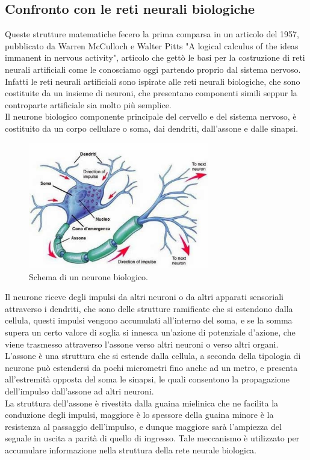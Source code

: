 \subsection{Confronto con le reti neurali biologiche}

Queste strutture matematiche fecero la prima comparsa in un articolo del 1957, pubblicato da Warren McCulloch e Walter Pitts
"A logical calculus of the ideas immanent in nervous activity", articolo che gettò le basi per la costruzione di reti neurali artificiali
come le conosciamo oggi partendo proprio dal sistema nervoso.
Infatti le reti neurali artificiali sono ispirate alle reti neurali biologiche, che sono costituite da un insieme di neuroni,
che presentano componenti simili seppur la controparte artificiale sia molto più semplice.\\
Il neurone biologico componente principale del cervello e del sistema nervoso, è costituito da un corpo cellulare o soma, dai dendriti, 
dall'assone e dalle sinapsi.\\

    \begin{figure}[H]
        \centering
        \includegraphics[width=0.7\textwidth]{imgs/neurone.jpg}
        \caption{Schema di un neurone biologico.}
        \label{fig:neuron_bio}
    \end{figure}

Il neurone riceve degli impulsi da altri neuroni o da altri apparati sensoriali attraverso i dendriti, che sono delle strutture ramificate
che si estendono dalla cellula, questi impulsi vengono accumulati all'interno del soma, e se la somma supera un certo valore di soglia
si innesca un'azione di potenziale d'azione, che viene trasmesso attraverso l'assone verso altri neuroni o verso altri organi.
L'assone è una struttura che si estende dalla cellula, a seconda della tipologia di neurone può estendersi da pochi micrometri fino anche ad un metro,
e presenta all'estremità opposta del soma le sinapsi, le quali consentono la propagazione dell'impulso dall'assone ad altri neuroni.\\
La struttura dell'assone è rivestita dalla guaina mielinica che ne facilita la conduzione degli impulsi, maggiore è lo spessore della guaina
minore è la resistenza al passaggio dell'impulso, e dunque maggiore sarà l'ampiezza del segnale in uscita a parità di quello di ingresso. 
Tale meccanismo è utilizzato per accumulare informazione nella struttura della rete neurale biologica.\\


